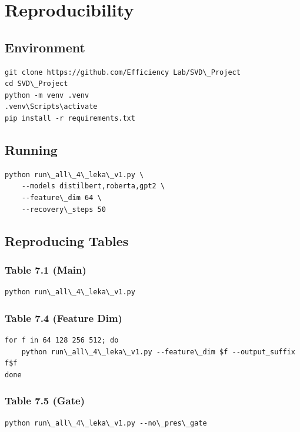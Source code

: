 \section{Reproducibility}

\subsection{Environment}

\begin{lstlisting}
git clone https://github.com/Efficiency Lab/SVD\_Project
cd SVD\_Project
python -m venv .venv
.venv\Scripts\activate
pip install -r requirements.txt
\end{lstlisting}

\subsection{Running}

\begin{lstlisting}
python run\_all\_4\_leka\_v1.py \
    --models distilbert,roberta,gpt2 \
    --feature\_dim 64 \
    --recovery\_steps 50
\end{lstlisting}

\subsection{Reproducing Tables}

\subsubsection{Table 7.1 (Main)}
\begin{lstlisting}
python run\_all\_4\_leka\_v1.py
\end{lstlisting}

\subsubsection{Table 7.4 (Feature Dim)}
\begin{lstlisting}
for f in 64 128 256 512; do
    python run\_all\_4\_leka\_v1.py --feature\_dim $f --output_suffix f$f
done
\end{lstlisting}

\subsubsection{Table 7.5 (Gate)}
\begin{lstlisting}
python run\_all\_4\_leka\_v1.py --no\_pres\_gate
\end{lstlisting}

